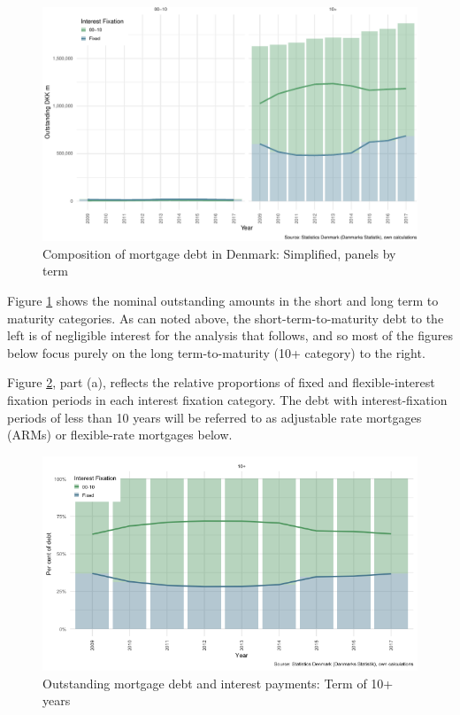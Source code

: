 \documentclass[
]{book}
\begin{document}
\begin{figure}
\centering
\includegraphics{figures/debt-composition-dk-simp-1.pdf}
\caption{\label{fig:debt-composition-dk-simp}Composition of mortgage debt in Denmark: Simplified, panels by term}
\end{figure}

Figure \ref{fig:debt-composition-dk-simp} shows the nominal outstanding amounts in the short and long term to maturity categories. As can noted above, the short-term-to-maturity debt to the left is of negligible interest for the analysis that follows, and so most of the figures below focus purely on the long term-to-maturity (10+ category) to the right.

Figure \ref{fig:debt-composition-dk-simp-term}, part (a), reflects the relative proportions of fixed and flexible-interest fixation periods in each interest fixation category. The debt with interest-fixation periods of less than 10 years will be referred to as adjustable rate mortgages (ARMs) or flexible-rate mortgages below.

\begin{figure}[H]
\includegraphics[width=0.95\linewidth]{figures/debt-composition-dk-simp-term-1} \caption{Outstanding mortgage debt and interest payments: Term of 10+ years}\label{fig:debt-composition-dk-simp-term}
\end{figure}
\end{document}
